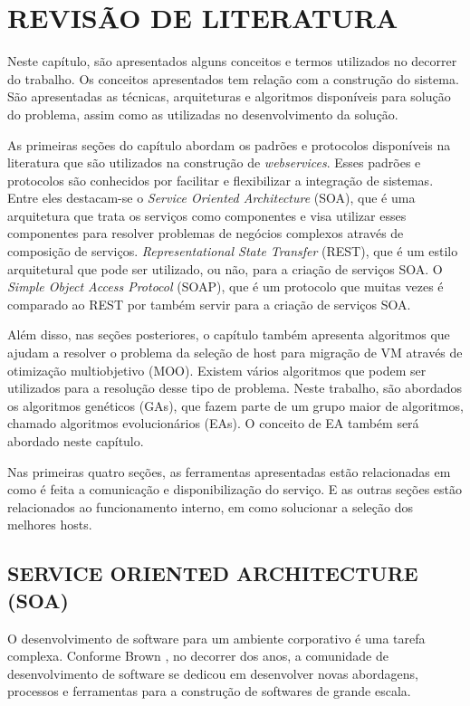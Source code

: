 \chapter{REVISÃO DE LITERATURA}
\label{chap:fundamentacaoTeorica}

Neste capítulo, são apresentados alguns conceitos e termos utilizados no decorrer do trabalho. 
Os conceitos apresentados tem relação com a construção do sistema. São apresentadas as 
técnicas, arquiteturas e algoritmos disponíveis para solução do problema, assim como as utilizadas no 
desenvolvimento da solução.

As primeiras seções do capítulo abordam os padrões e protocolos disponíveis na literatura que são 
utilizados na construção de \textit{webservices}.  Esses padrões e protocolos 
são conhecidos por facilitar e flexibilizar a integração de sistemas. 
Entre eles destacam-se o \textit{Service Oriented Architecture} (SOA), que é
uma arquitetura que trata os serviços como componentes e visa utilizar 
esses componentes para resolver problemas de negócios complexos através de composição
de serviços. \textit{Representational State Transfer} (REST), que é um estilo arquitetural 
que pode ser utilizado, ou não, para a criação de serviços SOA. O \textit{Simple Object Access Protocol}
(SOAP), que é um protocolo que muitas vezes é comparado ao REST por também servir
para a criação de serviços SOA.

Além disso, nas seções posteriores, o capítulo também apresenta algoritmos que ajudam a 
resolver o problema da seleção de host para migração de VM através de otimização multiobjetivo (MOO). 
Existem vários algoritmos que podem ser utilizados para a resolução desse tipo de problema. 
Neste trabalho, são abordados os algoritmos genéticos (GAs), que fazem parte de um grupo 
maior de algoritmos, chamado algoritmos evolucionários (EAs). 
O conceito de EA também será abordado neste capítulo.

Nas primeiras quatro seções, as ferramentas apresentadas 
estão relacionadas em como é feita a comunicação e disponibilização do serviço. 
E as outras seções estão relacionados ao funcionamento interno, em como solucionar
a seleção dos melhores hosts.

\section{SERVICE ORIENTED ARCHITECTURE (SOA)}
O desenvolvimento de software para um ambiente corporativo é uma tarefa complexa. 
Conforme Brown \cite{brown}, no decorrer dos anos, a comunidade de desenvolvimento de software se 
dedicou em desenvolver novas abordagens, processos e ferramentas para a construção de softwares de 
grande escala. 

